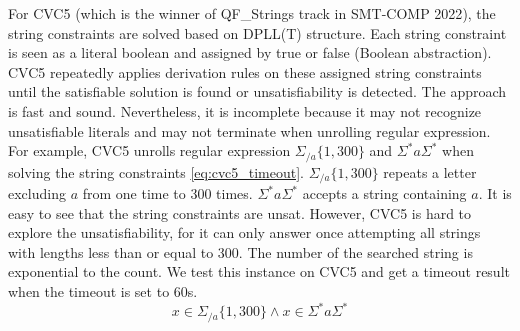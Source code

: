 {%
For CVC5\cite{cvc5} (which is the winner of QF\_Strings track in SMT-COMP 2022\cite{smt-comp}), the string constraints are solved based on DPLL(T) structure. Each string constraint is seen as a literal boolean and assigned by true or false (Boolean abstraction). CVC5 repeatedly applies derivation rules on these assigned string constraints until the satisfiable solution is found or unsatisfiability is detected. The approach is fast and sound. Nevertheless, it is incomplete because it may not recognize unsatisfiable literals and may not terminate when unrolling regular expression. For example, CVC5 unrolls regular expression $\Sigma_{/a}\{1,300\}$ and $\Sigma^*a\Sigma^*$ when solving the string constraints \ref{eq:cvc5_timeout}. $\Sigma_{/a}\{1,300\}$ repeats a letter excluding $a$ from one time to 300 times. $\Sigma^*a\Sigma^*$ accepts a string containing $a$. It is easy to see that the string constraints are unsat.
However, CVC5 is hard to explore the unsatisfiability, for it can only answer once attempting all strings with lengths less than or equal to 300. The number of the searched string is exponential to the count. We test this instance on CVC5 and get a timeout result when the timeout is set to 60s.
\begin{equation} \label{eq:cvc5_timeout}
  x\in \Sigma_{/a}\{1,300\}\wedge x\in \Sigma^*a\Sigma^*
\end{equation}
}
